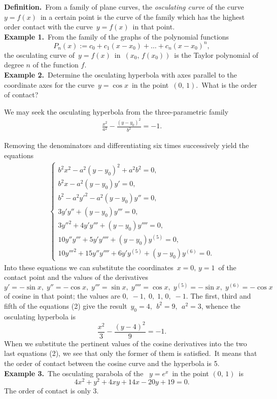 \documentclass[12pt]{article}
\theoremstyle{definition}
\begin{document}
\textbf{Definition.}\, From a family of plane curves, the {\em osculating curve} of the curve \,$y = f(x)$\, in a certain point is the curve of the family which has the highest order contact with the curve \,$y = f(x)$\, in that point.\\

\textbf{Example 1.}\, From the family of the graphs of the polynomial functions
$$P_n(x) := c_0+c_1(x-x_0)+\ldots+c_n(x-x_0)^n,$$
the osculating curve of\, $y = f(x)$\, in\, $(x_0,\,f(x_0))$\, is the Taylor polynomial of degree $n$ of the function $f$.\\

\textbf{Example 2.}\, Determine the osculating hyperbola with axes parallel to the coordinate axes for the curve \,$y = \cos{x}$\, in the point \,$(0,\,1)$.\, What is the order of contact?

We may seek the osculating hyperbola from the three-parametric family
\begin{align}
\frac{x^2}{a^2}-\frac{(y-y_0)^2}{b^2} = -1.
\end{align}

Removing the denominators and differentiating six times successively yield the equations
\begin{align}
\begin{cases}
b^2x^2-a^2(y-y_0)^2+ a^2b^2 = 0,\\
b^2x-a^2(y-y_0)y' = 0,\\
b^2-a^2y'^2-a^2(y-y_0)y'' = 0,\\
3y'y''+(y-y_0)y''' = 0,\\
3y''^2+4y'y'''+(y-y_0)y'''' = 0,\\
10y''y'''+5y'y''''+(y-y_0)y^{(5)} = 0,\\
10y'''^2+15y''y''''+6y'y^{(5)}+(y-y_0)y^{(6)} = 0.
\end{cases}
\end{align}
Into these equations we can substitute the coordinates \,$x = 0,\, y = 1$\, of the contact point and the values of the derivatives 
$$y' = -\sin{x},\;y'' = -\cos{x},\;y''' = \sin{x},\;y'''' = \cos{x},\;y^{(5)} = -\sin{x},\;y^{(6)} = -\cos{x}$$ 
of cosine in that point; the values are\; $0,\;-1,\;0,\;1,\,0,\;-1$.\; The first, third and fifth of the equations (2) give the result\, $y_0 = 4,\;\, b^2 = 9,\;\, a^2 = 3$, whence the osculating hyperbola is
$$\frac{x^2}{3}-\frac{(y-4)^2}{9} = -1.$$
When we substitute the pertinent values of the cosine derivatives into the two last equations (2), we see that only the former of them is satisfied.\, It means that the order of contact between the cosine curve and the hyperbola is 5.\\

\textbf{Example 3.}\, The osculating parabola of the \, $y = e^x$\, in the point $(0,\,1)$\, is
$$4x^2+y^2+4xy+14x-20y+19 = 0.$$
The order of contact is only 3.
\end{document}
